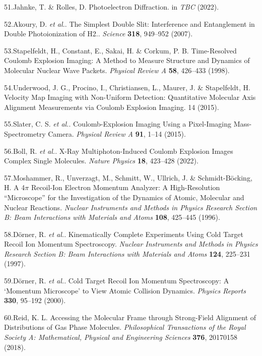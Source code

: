\documentclass[10pt]{article}
\begin{document}
\label{csl:51}51.Jahnke, T. \& Rolles, D. {Photoelectron {{Diffraction}}}. in \textit{{{TBC}}} (2022).

\label{csl:52}52.Akoury, D. \textit{et al.}. {The Simplest Double Slit: Interference and Entanglement in Double Photoionization of {{H2}}.}. \textit{Science} \textbf{318}, 949–952 (2007).

\label{csl:53}53.Stapelfeldt, H., Constant, E., Sakai, H. \& Corkum, P. B. {Time-Resolved {{Coulomb}} Explosion Imaging: {{A}} Method to Measure Structure and Dynamics of Molecular Nuclear Wave Packets}. \textit{Physical Review A} \textbf{58}, 426–433 (1998).

\label{csl:54}54.Underwood, J. G., Procino, I., Christiansen, L., Maurer, J. \& Stapelfeldt, H. {Velocity Map Imaging with Non-Uniform Detection: Quantitative Molecular Axis Alignment Measurements via {{Coulomb}} Explosion Imaging}. 14 (2015).

\label{csl:55}55.Slater, C. S. \textit{et al.}. {Coulomb-Explosion Imaging Using a Pixel-Imaging Mass-Spectrometry Camera}. \textit{Physical Review A} \textbf{91}, 1–14 (2015).

\label{csl:56}56.Boll, R. \textit{et al.}. {X-Ray Multiphoton-Induced {{Coulomb}} Explosion Images Complex Single Molecules}. \textit{Nature Physics} \textbf{18}, 423–428 (2022).

\label{csl:57}57.Moshammer, R., Unverzagt, M., Schmitt, W., Ullrich, J. \& {Schmidt-B{\"o}cking}, H. {A 4{$\pi$} Recoil-Ion Electron Momentum Analyzer: A High-Resolution ``Microscope'' for the Investigation of the Dynamics of Atomic, Molecular and Nuclear Reactions}. \textit{Nuclear Instruments and Methods in Physics Research Section B: Beam Interactions with Materials and Atoms} \textbf{108}, 425–445 (1996).

\label{csl:58}58.D{\"o}rner, R. \textit{et al.}. {Kinematically Complete Experiments Using Cold Target Recoil Ion Momentum Spectroscopy}. \textit{Nuclear Instruments and Methods in Physics Research Section B: Beam Interactions with Materials and Atoms} \textbf{124}, 225–231 (1997).

\label{csl:59}59.D{\"o}rner, R. \textit{et al.}. {Cold {{Target Recoil Ion Momentum Spectroscopy}}: A `Momentum Microscope' to View Atomic Collision Dynamics}. \textit{Physics Reports} \textbf{330}, 95–192 (2000).

\label{csl:60}60.Reid, K. L. {Accessing the Molecular Frame through Strong-Field Alignment of Distributions of Gas Phase Molecules}. \textit{Philosophical Transactions of the Royal Society A: Mathematical, Physical and Engineering Sciences} \textbf{376}, 20170158 (2018).
\end{document}
